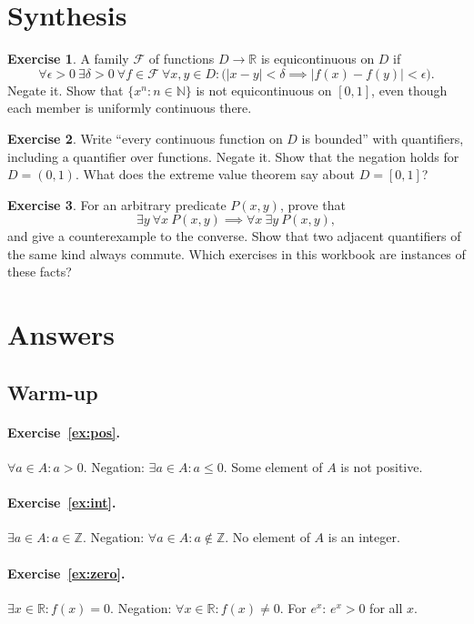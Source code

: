 \documentclass{workbook}
\theoremstyle{definition}
\newtheorem{exercise}{Exercise}[section]
\newcommand{\N}{\mathbb{N}}
\newcommand{\Z}{\mathbb{Z}}
\newcommand{\R}{\mathbb{R}}
\newcommand{\ans}[1]{\paragraph{Exercise~\ref{#1}.}}
\begin{document}
\section{Synthesis}

\begin{exercise}\label{ex:equi}
A family $\mathcal{F}$ of functions $D \to \R$ is equicontinuous on $D$ if
\[
  \forall \epsilon > 0\ \exists \delta > 0\ \forall f \in \mathcal{F}\ \forall x, y \in D : \bigl(|x - y| < \delta \implies |f(x) - f(y)| < \epsilon\bigr).
\]
Negate it. Show that $\{x^n : n \in \N\}$ is not equicontinuous on $[0,1]$, even though each member is uniformly continuous there.
\end{exercise}

\begin{exercise}\label{ex:everycont}
Write ``every continuous function on $D$ is bounded'' with quantifiers, including a quantifier over functions. Negate it. Show that the negation holds for $D = (0,1)$. What does the extreme value theorem say about $D = [0,1]$?
\end{exercise}

\begin{exercise}\label{ex:swapgeneral}
For an arbitrary predicate $P(x, y)$, prove that
\[
  \exists y\ \forall x\ P(x,y) \implies \forall x\ \exists y\ P(x,y),
\]
and give a counterexample to the converse. Show that two adjacent quantifiers of the same kind always commute. Which exercises in this workbook are instances of these facts?
\end{exercise}

\newpage
\section{Answers}\label{sec:answers}

\subsection*{Warm-up}

\ans{ex:pos}
$\forall a \in A : a > 0$. Negation: $\exists a \in A : a \le 0$. Some element of $A$ is not positive.

\ans{ex:int}
$\exists a \in A : a \in \Z$. Negation: $\forall a \in A : a \notin \Z$. No element of $A$ is an integer.

\ans{ex:zero}
$\exists x \in \R : f(x) = 0$. Negation: $\forall x \in \R : f(x) \ne 0$. For $e^x$: $e^x > 0$ for all $x$.
\end{document}
